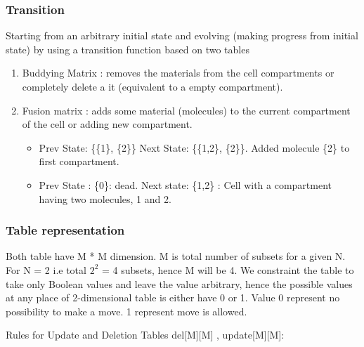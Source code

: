 \documentclass[preprint,12pt]{elsarticle}
\begin{document}
\subsubsection{Transition}
Starting from an arbitrary initial state and evolving (making progress from initial state) by using a transition function based on two tables
\begin{enumerate}
\item  Buddying Matrix : removes the materials from the cell compartments or completely delete a it (equivalent to a empty compartment).
\item Fusion matrix : adds some material (molecules) to the current compartment of the cell or adding new compartment.

\begin{itemize}
\item Prev State: \{\{1\}, \{2\}\} Next State:  \{\{1,2\}, \{2\}\}.
               Added molecule \{2\} to first compartment.    
\item Prev State : \{0\}: dead. Next state: \{1,2\} :
               Cell with a compartment having two molecules, 1 and 2.
\end{itemize}
\end{enumerate}
    
\subsubsection{Table representation}
 Both table have M * M dimension. M is total number of subsets for a given N.  For N = 2 i.e total $2^{2}$ = 4 subsets, hence M will be 4. We constraint the table to take only Boolean values and leave the value arbitrary, hence the possible values at any place of 2-dimensional table is either have 0 or 1. Value 0 represent no possibility to make a move. 1 represent move is allowed.  
 
Rules for Update and Deletion Tables del[M][M] , update[M][M]: 
\end{document}
